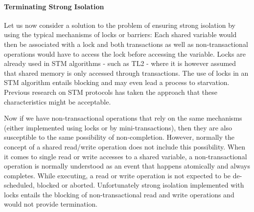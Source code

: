 \paragraph{Terminating Strong  Isolation}


Let us now consider a solution to  the problem of  ensuring strong isolation 
by using the typical mechanisms of locks or barriers: Each shared
variable would then  
be associated with a lock and both transactions as well as non-transactional 
operations would have to access the lock before accessing the variable.
Locks are already used  in STM algorithms - such as TL2 \cite{DSS06} - where it is
however     assumed   that  shared   memory   is   only  accessed   through
transactions. The use  of locks  in an STM algorithm  entails blocking and may
even lead a process to starvation.
Previous research on STM protocols has taken the approach that
these characteristics might be acceptable.

Now if we have non-transactional operations that rely on the same mechanisms
(either implemented using locks or by mini-transactions), then they are also susceptible
to the same possibility of non-completion.
However, normally the concept of a shared read/write operation does not include this possibility.
When it  comes to single read or  write accesses  to  a shared
variable, a  non-transactional operation is normally understood  as an
event  that  happens   atomically  and always  completes.
While executing, a  read  or write  operation   is  not 
expected  to  be de-scheduled, blocked or aborted.  
Unfortunately   strong
isolation  implemented with  locks  entails the blocking  
of non-transactional read and write operations and would not provide termination.

